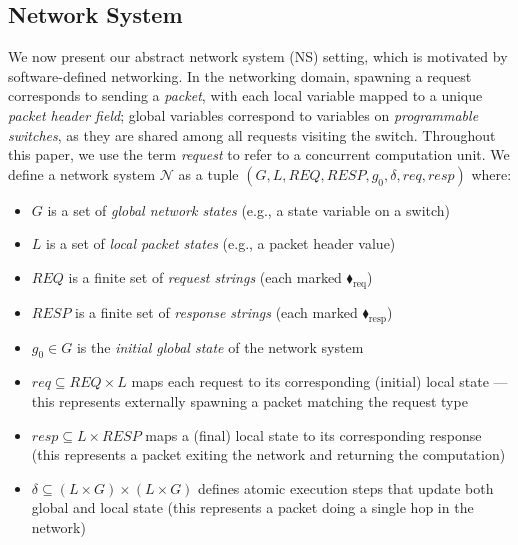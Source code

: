 \subsection{Network System}    
We now present our abstract network system (NS) setting, which is motivated by software-defined networking. In the networking domain, spawning a request corresponds to sending a \textit{packet}, with each local variable mapped to a unique \textit{packet header field}; global variables correspond to variables on \textit{programmable switches}, as they are shared among all requests visiting the switch. Throughout this paper, we use the term \emph{request} to refer to a concurrent computation unit. 
%
We define a network system $\mathcal{N}$ as a tuple $(G, L, \mathit{REQ},  \mathit{RESP}, g_0, \delta, \mathit{req}, \mathit{resp})$ where:
\begin{itemize}
\item $G$ is a set of \textit{global network states} (e.g., a state variable on a switch)

\item $L$ is a set of \textit{local packet states} (e.g., a packet header value)

\item $\mathit{REQ}$ is a finite set of\textit{ request strings} (each marked {\color{ForestGreen}$\blacklozenge_\text{req}$})

\item $\mathit{RESP}$ is a finite set of \textit{response strings} (each marked {\color{red}$\blacklozenge_\text{resp}$})

\item $g_0 \in G$ is the \textit{initial global state} of the network system

\item $\mathit{req} \subseteq \mathit{REQ} \times  L$ maps each request to its corresponding (initial) local state --- this represents externally spawning a packet matching the request type

\item $\mathit{resp} \subseteq L \times \mathit{RESP}$ maps a (final) local state to its corresponding response (this represents a packet exiting the network and returning the computation)

\item $\delta \subseteq  (L \times G) \times ( L \times G)$ defines atomic execution steps that update both global and local state (this represents a packet doing a single hop in the network)
\end{itemize}

